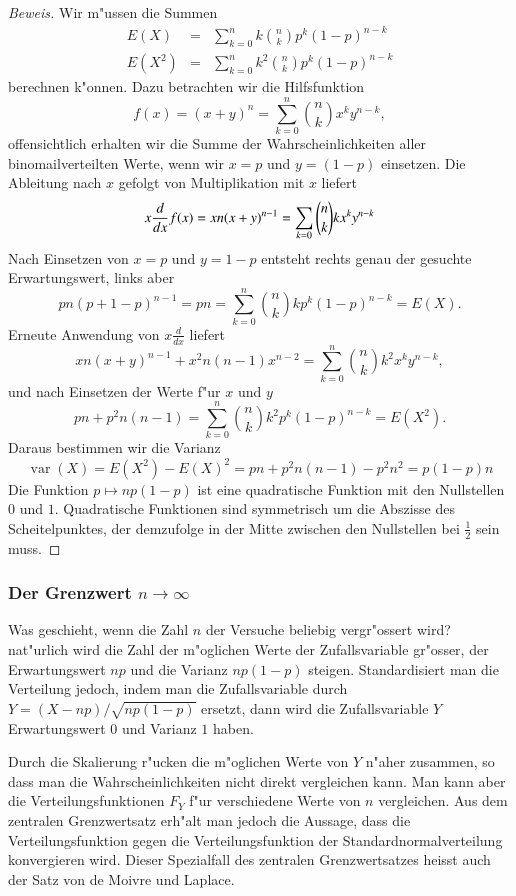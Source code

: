 \begin{proof}[Beweis] Wir m"ussen die Summen
\begin{eqnarray*}
E(X)&=&\sum_{k=0}^nk\binom{n}{k}p^k(1-p)^{n-k}\\
E(X^2)&=&\sum_{k=0}^nk^2\binom{n}{k}p^k(1-p)^{n-k}
\end{eqnarray*}
berechnen k"onnen. Dazu betrachten wir die Hilfsfunktion
\[
f(x)=(x+y)^n=\sum_{k=0}^n\binom{n}{k}x^ky^{n-k},
\]
offensichtlich erhalten wir die Summe der Wahrscheinlichkeiten aller
binomailverteilten Werte, wenn
wir $x=p$ und $y=(1-p)$ einsetzen.
Die Ableitung nach $x$ gefolgt von Multiplikation mit $x$ liefert
\[
 x\frac{d}{dx}f(x)
=xn(x+y)^{n-1}\\
=\sum_{k=0}\binom{n}{k}kx^ky^{n-k}
\]
Nach Einsetzen von $x=p$ und $y=1-p$ entsteht rechts genau
der gesuchte Erwartungswert, links aber
\[
pn(p+1-p)^{n-1}=pn=\sum_{k=0}^n\binom{n}{k}kp^k(1-p)^{n-k}=E(X).
\]
Erneute Anwendung von $x\frac{d}{dx}$ liefert
\[
xn(x+y)^{n-1}+x^2 n(n-1)x^{n-2}=\sum_{k=0}^n\binom{n}{k}k^2x^ky^{n-k},
\]
und nach Einsetzen der Werte f"ur $x$ und $y$
\[
pn+p^2n(n-1)=\sum_{k=0}^n\binom{n}{k}k^2p^k(1-p)^{n-k}=E(X^2).
\]
Daraus bestimmen wir die Varianz
\[
\operatorname{var}(X)=E(X^2)-E(X)^2=pn+p^2n(n-1)-p^2n^2=p(1-p)n
\]
Die Funktion $p\mapsto np(1-p)$ ist eine quadratische Funktion mit den
Nullstellen $0$ und $1$. Quadratische Funktionen sind symmetrisch um
die Abszisse des Scheitelpunktes, der demzufolge in der Mitte zwischen
den Nullstellen bei $\frac12$ sein muss.
\end{proof}

\subsubsection{Der Grenzwert \texorpdfstring{$n\to\infty$}{n gegen unendlich}}
Was geschieht, wenn die Zahl $n$ der Versuche beliebig vergr"ossert wird?
nat"urlich wird die Zahl der m"oglichen Werte der Zufallsvariable
gr"osser, der Erwartungswert $np$ und die Varianz $np(1-p)$ steigen.
Standardisiert man die Verteilung jedoch, indem man die Zufallsvariable
durch $Y=(X-np)/\sqrt{np(1-p)}$ ersetzt, dann wird die Zufallsvariable $Y$
Erwartungswert $0$ und Varianz $1$ haben. 

Durch die Skalierung r"ucken die m"oglichen Werte von $Y$ n"aher zusammen,
so dass man die Wahrscheinlichkeiten nicht direkt vergleichen kann.
Man kann aber die Verteilungsfunktionen $F_Y$ f"ur verschiedene Werte
von $n$ vergleichen. Aus dem zentralen Grenzwertsatz erh"alt man
jedoch die Aussage, dass die Verteilungsfunktion gegen die
Verteilungsfunktion der Standardnormalverteilung konvergieren wird.
Dieser Spezialfall des zentralen Grenzwertsatzes heisst auch der
Satz von de Moivre und Laplace.

